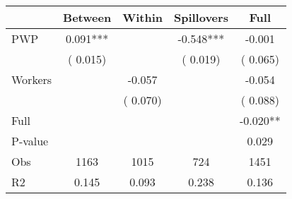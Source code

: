 
\begin{tabular}{l*{4}{c}}\hline&\multicolumn{1}{c}{Between}&\multicolumn{1}{c}{Within}&\multicolumn{1}{c}{Spillovers}&\multicolumn{1}{c}{Full}\\ \hline
 PWP           &              0.091***      &                                               &       -0.548*** &        -0.001                            \\ 
                               &        (       0.015)           &                                       &       (       0.019)     &      (       0.065)                                           \\ 
 Workers       &                                               &       -0.057    &                                &            -0.054                            \\ 
                               &                                               & (       0.070)                  &                                        &      (       0.088)                                           \\ 
\hline                                                                                                                                                                                                                                            
 Full                  &                                               &                                               &                                        &            -0.020**                                     \\ 
 P-value               &                                               &                                               &                                        &             0.029                                           \\ 
 Obs                   &               1163               &       1015                       &       724                &              1451                                               \\ 
 R2                    &                      0.145              &              0.093                      &              0.238               &                     0.136                                              \\ 
\hline \end{tabular}                                                                                                                                                                                                              
